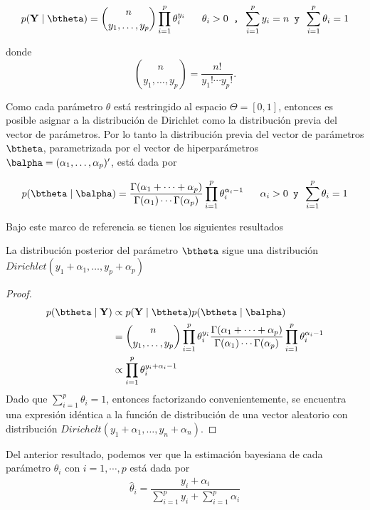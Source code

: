   \begin{equation}
  p(\mathbf{Y} \mid \btheta)=\binom{n}{y_1,\ldots,y_p}\prod_{i=1}^p\theta_i^{y_i} \ \ \ \ \ \theta_i>0 \texttt{ , }  \sum_{i=1}^py_i=n \texttt{ y } \sum_{i=1}^p\theta_i=1
  \end{equation}
  
  donde
  \begin{equation*}
  \binom{n}{y_1,\ldots,y_p}=\frac{n!}{y_1!\cdots y_p!}.
  \end{equation*}
  
  Como cada parámetro $\theta$ está restringido al espacio $\Theta=[0,1]$, entonces es posible asignar a la distribución de Dirichlet como la distribución previa del vector de parámetros. Por lo tanto la distribución previa del vector de parámetros $\btheta$, parametrizada por el vector de hiperparámetros $\balpha=(\alpha_1,\ldots,\alpha_p)'$, está dada por
  
  \begin{equation}
  p(\btheta \mid \balpha)=\frac{\Gamma(\alpha_1+\cdots+\alpha_p)}{\Gamma(\alpha_1)\cdots\Gamma(\alpha_p)}
  \prod_{i=1}^p\theta_i^{\alpha_i-1} \ \ \ \ \ \alpha_i>0 \texttt{ y } \sum_{i=1}^p\theta_i=1
  \end{equation}
  
Bajo este marco de referencia se tienen los siguientes resultados
  
\begin{Res}
La distribución posterior del parámetro $\btheta$ sigue una distribución $Dirichlet(y_1+\alpha_1,\ldots,y_p+\alpha_p)$
\end{Res}

\begin{proof}
\begin{align*}
p(\btheta \mid \mathbf{Y})&\propto p(\mathbf{Y} \mid \btheta)p(\btheta \mid \balpha)\\
&=\binom{n}{y_1,\ldots,y_p}\prod_{i=1}^p\theta_i^{y_i}\frac{\Gamma(\alpha_1+\cdots+\alpha_p)}{\Gamma(\alpha_1)
  \cdots\Gamma(\alpha_p)}
\prod_{i=1}^p\theta_i^{\alpha_i-1}\\
&\propto \prod_{i=1}^p\theta_i^{y_i+\alpha_i-1}
\end{align*}
Dado que $\sum_{i=1}^p\theta_i=1$, entonces factorizando convenientemente, se encuentra una expresión idéntica a la función de distribución de una vector aleatorio con distribución $Dirichelt(y_1+\alpha_1,\ldots,y_n+\alpha_n)$.
\end{proof}

Del anterior resultado, podemos ver que la estimación bayesiana de cada parámetro $\theta_i$ con $i=1,\cdots,p$ está dada por
\begin{align*}
\hat{\theta}_i=\dfrac{y_i+\alpha_i}{\sum_{i=1}^py_i+\sum_{i=1}^p\alpha_i}
\end{align*}

